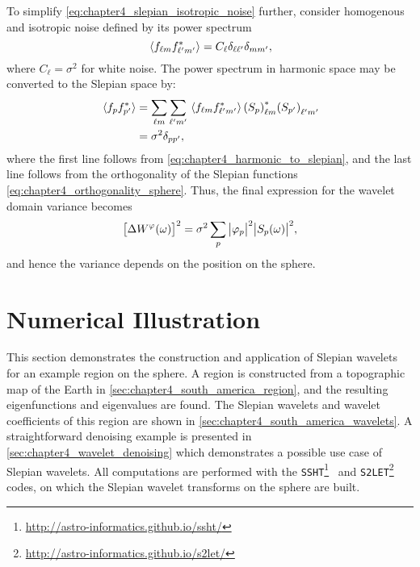 To simplify \cref{eq:chapter4_slepian_isotropic_noise} further, consider homogenous and isotropic noise defined by its power spectrum
%
\begin{equation}
	\expval*{\harmonic{f} \conj{\harmonic[']{f}}}
	= C_{\ell} \delta_{\ell\ell'} \delta_{mm'},
\end{equation}
%
where \(C_{\ell} = \sigma^{2}\) for white noise.
The power spectrum in harmonic space may be converted to the Slepian space by:
%
\begin{align}
	\expval*{\slepian{f} \conj{\slepian[']{f}}}
	 & = \harmonicSum \harmonicSum['] \expval*{\harmonic{f} \conj{\harmonic[']{f}}} \conj{\harmonic{(\slepian{S})}} \harmonic[']{(\slepian[']{S})} \nonumber \\
	 & = \sigma^{2} \delta_{pp'},
\end{align}
%
where the first line follows from \cref{eq:chapter4_harmonic_to_slepian}, and the last line follows from the orthogonality of the Slepian functions \cref{eq:chapter4_orthogonality_sphere}.
Thus, the final expression for the wavelet domain variance becomes
%
\begin{equation}\label{eq:chapter4_wavelet_variance}
	\variance{\pixel{W^{\varphi}}}
	= \sigma^{2} \slepianSum \abs{\slepian{\varphi}}^{2} \abs{\pixel{\slepian{S}}}^{2},
\end{equation}
%
and hence the variance depends on the position on the sphere.

\section{Numerical Illustration}\label{sec:chapter4_numerical_illustration}

This section demonstrates the construction and application of Slepian wavelets for an example region on the sphere.
A region is constructed from a topographic map of the Earth in \cref{sec:chapter4_south_america_region}, and the resulting eigenfunctions and eigenvalues are found.
The Slepian wavelets and wavelet coefficients of this region are shown in \cref{sec:chapter4_south_america_wavelets}.
A straightforward denoising example is presented in \cref{sec:chapter4_wavelet_denoising} which demonstrates a possible use case of Slepian wavelets.
All computations are performed with the \texttt{SSHT}\footnote{\url{http://astro-informatics.github.io/ssht/}}~\autocite{McEwen2011} and \texttt{S2LET}\footnote{\url{http://astro-informatics.github.io/s2let/}}~\autocite{Leistedt2013} codes, on which the Slepian wavelet transforms on the sphere are built.

